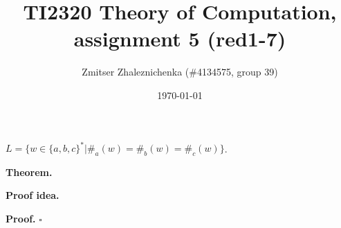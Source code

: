 \documentclass[a4paper, notitlepage]{article}
\begin{document}
\makeatletter
\renewcommand\paragraph{\@startsection{paragraph}{4}{\z@}%
  {-3.25ex\@plus -1ex \@minus -.2ex}%
  {1.5ex \@plus .2ex}%
  {\normalfont\normalsize\bfseries}}
\makeatother

\title{TI2320 Theory of Computation, assignment 5 (red1-7)} 
\author{Zmitser Zhaleznichenka (\#4134575, group 39)}
\date{\today}
\maketitle

\setcounter{secnumdepth}{0}

\begin{center} 
$L = \{w \in \{a,b,c\}^* | \#_a(w) = \#_b(w) = \#_c(w)\}$.
\end{center}

\textbf{Theorem.} \newline

\textbf{Proof idea.} \newline

\textbf{Proof.} $\square$
\end{document}
